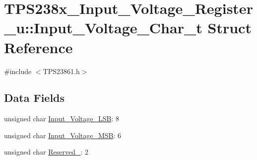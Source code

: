 \hypertarget{struct_t_p_s238x___input___voltage___register__u_1_1_input___voltage___char__t}{\section{T\-P\-S238x\-\_\-\-Input\-\_\-\-Voltage\-\_\-\-Register\-\_\-u\-:\-:Input\-\_\-\-Voltage\-\_\-\-Char\-\_\-t Struct Reference}
\label{struct_t_p_s238x___input___voltage___register__u_1_1_input___voltage___char__t}
}


{\ttfamily \#include $<$T\-P\-S23861.\-h$>$}

\subsection*{Data Fields}
\begin{DoxyCompactItemize}
\item 
unsigned char \hyperlink{struct_t_p_s238x___input___voltage___register__u_1_1_input___voltage___char__t_a8d41c9a793cbb5ef18ecc5086f968e24}{Input\-\_\-\-Voltage\-\_\-\-L\-S\-B}\-: 8
\item 
unsigned char \hyperlink{struct_t_p_s238x___input___voltage___register__u_1_1_input___voltage___char__t_a3e4b208dd428848570ab1ac8ba401a75}{Input\-\_\-\-Voltage\-\_\-\-M\-S\-B}\-: 6
\item 
unsigned char \hyperlink{struct_t_p_s238x___input___voltage___register__u_1_1_input___voltage___char__t_a50e3c4b78f4d81f0ff024dceaa5b062f}{Reserved\-\_}\-: 2
\end{DoxyCompactItemize}


